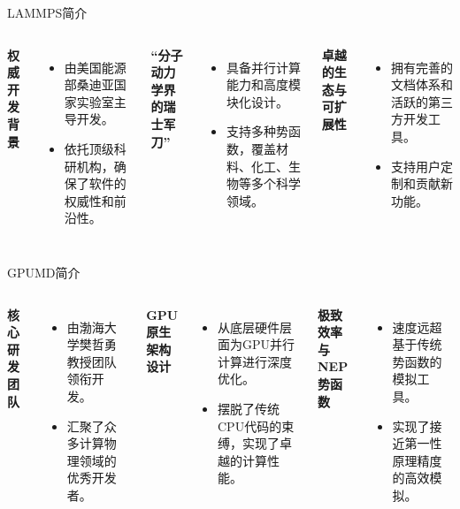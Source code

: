 \documentclass{beamer}
\begin{document}
\begin{frame}{LAMMPS简介}
    \begin{columns}
        \textbf{权威开发背景}
        \begin{itemize}
            \item 由美国能源部桑迪亚国家实验室主导开发。
            \item 依托顶级科研机构，确保了软件的权威性和前沿性。
        \end{itemize}
        \textbf{“分子动力学界的瑞士军刀”}
        \begin{itemize}
            \item 具备并行计算能力和高度模块化设计。
            \item 支持多种势函数，覆盖材料、化工、生物等多个科学领域。
        \end{itemize}
        \textbf{卓越的生态与可扩展性}
        \begin{itemize}
            \item 拥有完善的文档体系和活跃的第三方开发工具。
            \item 支持用户定制和贡献新功能。
        \end{itemize}
    \end{columns}
\end{frame}

\begin{frame}{GPUMD简介}
    \begin{columns}
        \textbf{核心研发团队}
        \begin{itemize}
            \item 由渤海大学樊哲勇教授团队领衔开发。
            \item 汇聚了众多计算物理领域的优秀开发者。
        \end{itemize}
        \textbf{GPU原生架构设计}
        \begin{itemize}
            \item 从底层硬件层面为GPU并行计算进行深度优化。
            \item 摆脱了传统CPU代码的束缚，实现了卓越的计算性能。
        \end{itemize}
        \textbf{极致效率与NEP势函数}
        \begin{itemize}
            \item 速度远超基于传统势函数的模拟工具。
            \item 实现了接近第一性原理精度的高效模拟。
        \end{itemize}
    \end{columns}
\end{frame}
\end{document}
